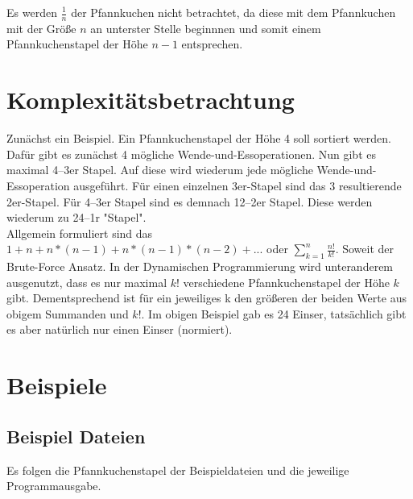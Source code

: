 Es werden $\frac{1}{n}$ der Pfannkuchen nicht betrachtet, da diese mit dem Pfannkuchen mit der
Grö{\ss}e $n$ an unterster Stelle beginnnen und somit einem Pfannkuchenstapel der Höhe $n - 1$ entsprechen.

\section{Komplexitätsbetrachtung}\label{subsec:komplexitatsbetrachtung}
Zunächst ein Beispiel.
Ein Pfannkuchenstapel der Höhe 4 soll sortiert werden.
Dafür gibt es zunächst 4 mögliche Wende-und-Essoperationen.
Nun gibt es maximal 4--3er Stapel.
Auf diese wird wiederum jede mögliche Wende-und-Essoperation ausgeführt.
Für einen einzelnen 3er-Stapel sind das 3 resultierende 2er-Stapel.
Für 4--3er Stapel sind es demnach 12--2er Stapel.
Diese werden wiederum zu 24--1r "Stapel". \\
Allgemein formuliert sind das $ 1 + n + n*(n-1) + n*(n - 1)*(n-2) + ...$ oder $\sum_{k=1}^{n} \frac{n!}{k!}$.
Soweit der Brute-Force Ansatz.
In der Dynamischen Programmierung wird unteranderem ausgenutzt, dass
es nur maximal $k!$ verschiedene Pfannkuchenstapel der Höhe $k$ gibt.
Dementsprechend ist für ein jeweiliges k den grö{\ss}eren der beiden Werte aus obigem Summanden und $k!$.
Im obigen Beispiel gab es 24 Einser, tatsächlich gibt es aber natürlich nur einen Einser (normiert).


\section{Beispiele}\label{sec:beispiele}

\subsection{Beispiel Dateien}\label{subsec:beispiel-dateien}
Es folgen die Pfannkuchenstapel der Beispieldateien und die jeweilige Programmausgabe.

